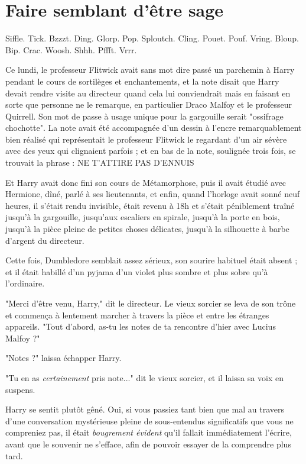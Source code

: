 
\chapter{Faire semblant d'être sage}

Siffle. Tick. Bzzzt. Ding. Glorp. Pop. Sploutch. Cling. Pouet. Pouf. Vring. Bloup. Bip. Crac. Woosh. Shhh. Pffft. Vrrr.

Ce lundi, le professeur Flitwick avait sans mot dire passé un parchemin à Harry pendant le cours de sortilèges et enchantements, et la note disait que Harry devait rendre visite au directeur quand cela lui conviendrait mais en faisant en sorte que personne ne le remarque, en particulier Draco Malfoy et le professeur Quirrell. Son mot de passe à usage unique pour la gargouille serait "ossifrage chochotte". La note avait été accompagnée d'un dessin à l'encre remarquablement bien réalisé qui représentait le professeur Flitwick le regardant d'un air sévère avec des yeux qui clignaient parfois ; et en bas de la note, soulignée trois fois, se trouvait la phrase : NE T'ATTIRE PAS D'ENNUIS

Et Harry avait donc fini son cours de Métamorphose, puis il avait étudié avec Hermione, dîné, parlé à ses lieutenants, et enfin, quand l'horloge avait sonné neuf heures, il s'était rendu invisible, était revenu à 18h et s'était péniblement traîné jusqu'à la gargouille, jusqu'aux escaliers en spirale, jusqu'à la porte en bois, jusqu'à la pièce pleine de petites choses délicates, jusqu'à la silhouette à barbe d'argent du directeur.

Cette fois, Dumbledore semblait assez sérieux, son sourire habituel était absent ; et il était habillé d'un pyjama d'un violet plus sombre et plus sobre qu'à l'ordinaire.

"Merci d'être venu, Harry," dit le directeur. Le vieux sorcier se leva de son trône et commença à lentement marcher à travers la pièce et entre les étranges appareils. "Tout d'abord, as-tu les notes de ta rencontre d'hier avec Lucius Malfoy ?"

"Notes ?" laissa échapper Harry.

"Tu en as \emph{certainement}  pris note..." dit le vieux sorcier, et il laissa sa voix en suspens.

Harry se sentit plutôt gêné. Oui, si vous passiez tant bien que mal au travers d'une conversation mystérieuse pleine de sous-entendus significatifs que vous ne compreniez pas, il était \emph{bougrement évident}  qu'il fallait immédiatement l'écrire, avant que le souvenir ne s'efface, afin de pouvoir essayer de la comprendre plus tard.

